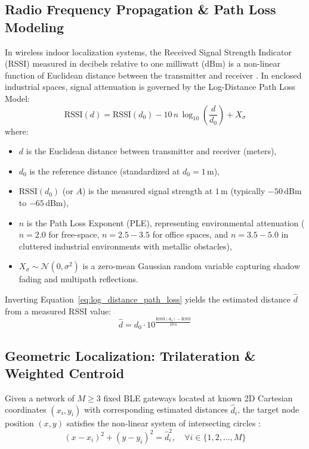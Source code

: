 \subsection{Radio Frequency Propagation \& Path Loss Modeling}
In wireless indoor localization systems, the Received Signal Strength Indicator (RSSI) measured in decibels relative to one milliwatt ($\text{dBm}$) is a non-linear function of Euclidean distance between the transmitter and receiver \cite{ble_indoor_survey}. In enclosed industrial spaces, signal attenuation is governed by the Log-Distance Path Loss Model:
\begin{equation}
\label{eq:log_distance_path_loss}
\text{RSSI}(d) = \text{RSSI}(d_0) - 10 \, n \, \log_{10}\left(\frac{d}{d_0}\right) + X_\sigma
\end{equation}
where:
\begin{itemize}
    \item $d$ is the Euclidean distance between transmitter and receiver (meters),
    \item $d_0$ is the reference distance (standardized at $d_0 = 1\,\text{m}$),
    \item $\text{RSSI}(d_0)$ (or $A$) is the measured signal strength at $1\,\text{m}$ (typically $-50\,\text{dBm}$ to $-65\,\text{dBm}$),
    \item $n$ is the Path Loss Exponent (PLE), representing environmental attenuation ($n=2.0$ for free-space, $n=2.5-3.5$ for office spaces, and $n=3.5-5.0$ in cluttered industrial environments with metallic obstacles),
    \item $X_\sigma \sim \mathcal{N}(0, \sigma^2)$ is a zero-mean Gaussian random variable capturing shadow fading and multipath reflections.
\end{itemize}

Inverting Equation~\eqref{eq:log_distance_path_loss} yields the estimated distance $\hat{d}$ from a measured RSSI value:
\begin{equation}
\label{eq:rssi_to_distance}
\hat{d} = d_0 \cdot 10^{\frac{\text{RSSI}(d_0) - \text{RSSI}}{10\,n}}
\end{equation}

\subsection{Geometric Localization: Trilateration \& Weighted Centroid}
Given a network of $M \ge 3$ fixed BLE gateways located at known 2D Cartesian coordinates $(x_i, y_i)$ with corresponding estimated distances $\hat{d}_i$, the target node position $(x, y)$ satisfies the non-linear system of intersecting circles \cite{trilateration_indoor}:
\begin{equation}
\label{eq:trilateration_circle}
(x - x_i)^2 + (y - y_i)^2 = \hat{d}_i^2, \quad \forall i \in \{1, 2, \dots, M\}
\end{equation}

